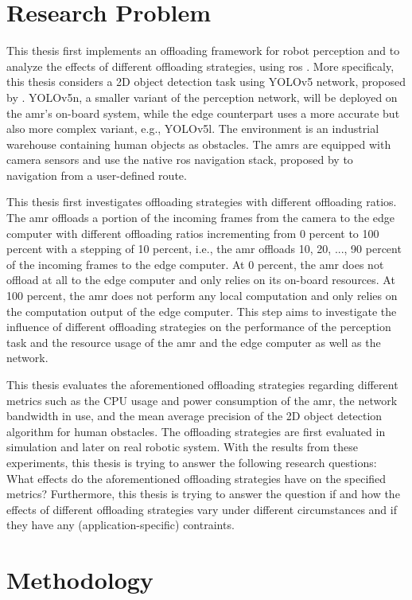 \section{Research Problem}

This thesis first implements an offloading framework for robot perception and to analyze the effects of different offloading strategies, using \gls{ros} \cite{Macenski2022}. More specificaly, this thesis considers a 2D object detection task using YOLOv5 network, proposed by \citeauthor*{Jocher2020}. YOLOv5n, a smaller variant of the perception network, will be deployed on the \gls{amr}'s on-board system, while the edge counterpart uses a more accurate but also more complex variant, e.g., YOLOv5l. The environment is an industrial warehouse containing human objects as obstacles. The \glspl{amr} are equipped with camera sensors and use the native \gls{ros} navigation stack, proposed by \citeauthor*{Macenski2020} to navigation from a user-defined route. 

This thesis first investigates offloading strategies with different offloading ratios. The \gls{amr} offloads a portion of the incoming frames from the camera to the edge computer with different offloading ratios incrementing from 0 percent to 100 percent with a stepping of 10 percent, i.e., the \gls{amr} offloads 10, 20, ..., 90 percent of the incoming frames to the edge computer. At 0 percent, the \gls{amr} does not offload at all to the edge computer and only relies on its on-board resources. At 100 percent, the \gls{amr} does not perform any local computation and only relies on the computation output of the edge computer. This step aims to investigate the influence of different offloading strategies on the performance of the perception task and the resource usage of the \gls{amr} and the edge computer as well as the network. 


This thesis evaluates the aforementioned offloading strategies regarding different metrics such as the CPU usage and power consumption of the \gls{amr}, the network bandwidth in use, and the mean average precision of the 2D object detection algorithm for human obstacles. The offloading strategies are first evaluated in simulation and later on real robotic system. With the results from these experiments, this thesis is trying to answer the following research questions: What effects do the aforementioned offloading strategies have on the specified metrics? Furthermore, this thesis is trying to answer the question if and how the effects of different offloading strategies vary under different circumstances and if they have any (application-specific) contraints.


\section{Methodology}